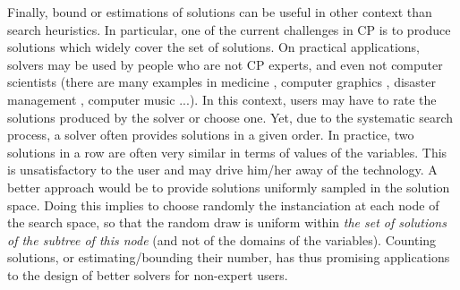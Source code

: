 Finally, bound or estimations of solutions can be useful in other context than search heuristics. In particular, one of the current challenges in CP is to produce solutions which widely cover the set of solutions. On practical applications, solvers may be used by people who are not CP experts, and even not computer scientists (there are many examples in medicine \cite{BettsMRTLEH15,DickersonMPST16}, computer graphics \cite{TaoCL08}, disaster management \cite{Hentenryck13}, computer music \cite{Hooker16,TA2011}...). In this context, users may have to rate the solutions produced by the solver or choose one. Yet, due to the systematic search process, a solver often provides solutions in a given order. In practice, two solutions in a row are often very similar in terms of values of the variables. This is unsatisfactory to the user and may drive him/her away of the technology. A better approach would be to provide solutions uniformly sampled in the solution space. Doing this implies to choose randomly the instanciation at each node of the search space, so that the random draw is uniform within \textit{the set of solutions of the subtree of this node} (and not of the domains of the variables). Counting solutions, or estimating/bounding their number, has thus promising applications to the design of better solvers for non-expert users.
 
 
 